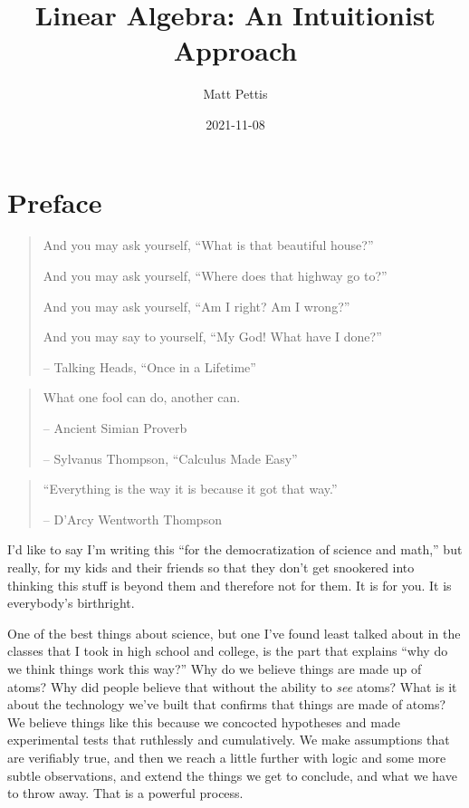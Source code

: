 \documentclass[
]{book}
\title{Linear Algebra: An Intuitionist Approach}
\author{Matt Pettis}
\date{2021-11-08}
\begin{document}
\maketitle

{
\setcounter{tocdepth}{1}
\tableofcontents
}
\hypertarget{preface}{%
\chapter{Preface}\label{preface}}

\begin{quote}
And you may ask yourself, ``What is that beautiful house?''

And you may ask yourself, ``Where does that highway go to?''

And you may ask yourself, ``Am I right? Am I wrong?''

And you may say to yourself, ``My God! What have I done?''

-- Talking Heads, ``Once in a Lifetime''
\end{quote}

\begin{quote}
What one fool can do, another can.

-- Ancient Simian Proverb

-- Sylvanus Thompson, ``Calculus Made Easy''
\end{quote}

\begin{quote}
``Everything is the way it is because it got that way.''

-- D'Arcy Wentworth Thompson
\end{quote}

I'd like to say I'm writing this ``for the democratization of science and math,'' but really, for my kids and their friends so that they don't get snookered into thinking this stuff is beyond them and therefore not for them. It is for you. It is everybody's birthright.

One of the best things about science, but one I've found least talked about in the classes that I took in high school and college, is the part that explains ``why do we think things work this way?'' Why do we believe things are made up of atoms? Why did people believe that without the ability to \emph{see} atoms? What is it about the technology we've built that confirms that things are made of atoms? We believe things like this because we concocted hypotheses and made experimental tests that ruthlessly and cumulatively. We make assumptions that are verifiably true, and then we reach a little further with logic and some more subtle observations, and extend the things we get to conclude, and what we have to throw away. That is a powerful process.
\end{document}
